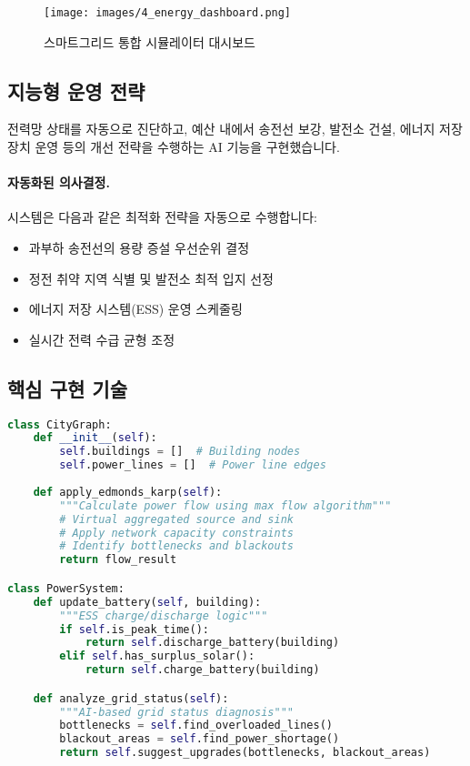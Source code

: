 \begin{figure}[H]
    \centering
    \texttt{[image: images/4\_energy\_dashboard.png]}
    \caption{스마트그리드 통합 시뮬레이터 대시보드}
    \label{fig:energy_dash}
\end{figure}

\subsection{지능형 운영 전략}
전력망 상태를 자동으로 진단하고, 예산 내에서 송전선 보강, 발전소 건설, 에너지 저장 장치 운영 등의 개선 전략을 수행하는 AI 기능을 구현했습니다. 

\paragraph{자동화된 의사결정.} 시스템은 다음과 같은 최적화 전략을 자동으로 수행합니다:
\begin{itemize}[itemsep=0pt]
    \item 과부하 송전선의 용량 증설 우선순위 결정
    \item 정전 취약 지역 식별 및 발전소 최적 입지 선정
    \item 에너지 저장 시스템(ESS) 운영 스케줄링
    \item 실시간 전력 수급 균형 조정
\end{itemize}

\subsection{핵심 구현 기술}
\begin{lstlisting}[language=Python]
class CityGraph:
    def __init__(self):
        self.buildings = []  # Building nodes
        self.power_lines = []  # Power line edges
        
    def apply_edmonds_karp(self):
        """Calculate power flow using max flow algorithm"""
        # Virtual aggregated source and sink
        # Apply network capacity constraints
        # Identify bottlenecks and blackouts
        return flow_result

class PowerSystem:
    def update_battery(self, building):
        """ESS charge/discharge logic"""
        if self.is_peak_time():
            return self.discharge_battery(building)
        elif self.has_surplus_solar():
            return self.charge_battery(building)

    def analyze_grid_status(self):
        """AI-based grid status diagnosis"""
        bottlenecks = self.find_overloaded_lines()
        blackout_areas = self.find_power_shortage()
        return self.suggest_upgrades(bottlenecks, blackout_areas)
\end{lstlisting}

